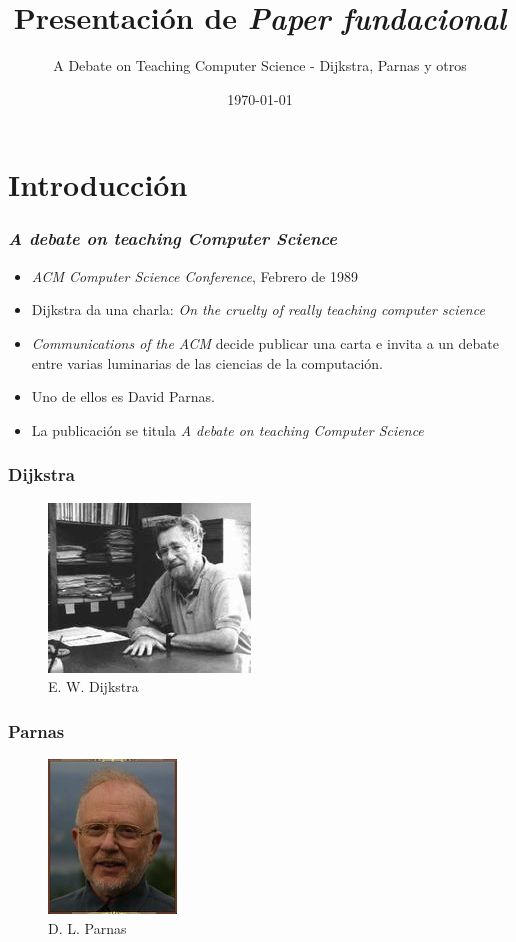 \documentclass[ignorenonframetext,]{beamer}
\title{Presentación de \emph{Paper fundacional}}
\author{A Debate on Teaching Computer Science - Dijkstra, Parnas y otros}
\date{\today}
\makeatletter
\def\ScaleIfNeeded{%
  \ifdim\Gin@nat@width>\linewidth
    \linewidth
  \else
    \Gin@nat@width
  \fi
}
\let\Oldincludegraphics\includegraphics
\renewcommand{\includegraphics}[2][]{\Oldincludegraphics[width=\ScaleIfNeeded]{#2}}
\makeatother
\begin{document}
\frame{\titlepage}

\begin{frame}
\tableofcontents[hideallsubsections]
\end{frame}

\section{Introducción}

\begin{frame}\frametitle{\emph{A debate on teaching Computer Science}}

\begin{itemize}[<+->]
\itemsep1pt\parskip0pt
\item
  \emph{ACM Computer Science Conference}, Febrero de 1989
\item
  Dijkstra da una charla: \emph{On the cruelty of really teaching
  computer science}
\item
  \emph{Communications of the ACM} decide publicar una carta e invita a
  un debate entre varias luminarias de las ciencias de la computación.
\item
  Uno de ellos es David Parnas.
\item
  La publicación se titula \emph{A debate on teaching Computer Science}
\end{itemize}

\end{frame}

\begin{frame}\frametitle{Dijkstra}

\begin{figure}[htbp]
\centering
\includegraphics{dijkstra.jpg}
\caption{E. W. Dijkstra}
\end{figure}

\end{frame}

\begin{frame}\frametitle{Parnas}

\begin{figure}[htbp]
\centering
\includegraphics{parnas.jpg}
\caption{D. L. Parnas}
\end{figure}

\end{frame}
\end{document}
